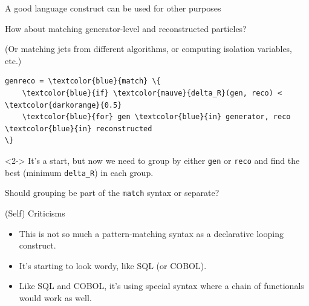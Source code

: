 \documentclass[aspectratio=169]{beamer}
\begin{document}
\begin{frame}[fragile]{A good language construct can be used for other purposes}
\Large
\vspace{0.25 cm}

How about matching generator-level and reconstructed particles?

\vspace{0.25 cm}
{\normalsize (Or matching jets from different algorithms, or computing isolation variables, etc.)}

\normalsize
\vspace{0.25 cm}
\begin{Verbatim}[commandchars=\\\{\}]
genreco = \textcolor{blue}{match} \{
    \textcolor{blue}{if} \textcolor{mauve}{delta_R}(gen, reco) < \textcolor{darkorange}{0.5}
    \textcolor{blue}{for} gen \textcolor{blue}{in} generator, reco \textcolor{blue}{in} reconstructed
\}
\end{Verbatim}

\Large
\vspace{0.25 cm}
\begin{uncoverenv}<2->
It's a start, but now we need to group by either {\tt gen} or {\tt reco} and find the best (minimum {\tt delta\_R}) in each group.

\vspace{0.5 cm}
Should grouping be part of the {\tt match} syntax or separate?
\end{uncoverenv}
\end{frame}

\begin{frame}{(Self) Criticisms}
\Large
\vspace{0.5 cm}
\begin{itemize}\setlength{\itemsep}{0.5 cm}
\item This is not so much a pattern-matching syntax as a declarative looping construct.
\item It's starting to look wordy, like SQL (or COBOL).
\item Like SQL and COBOL, it's using special syntax where a chain of functionals would work as well.
\end{itemize}
\end{frame}
\end{document}

